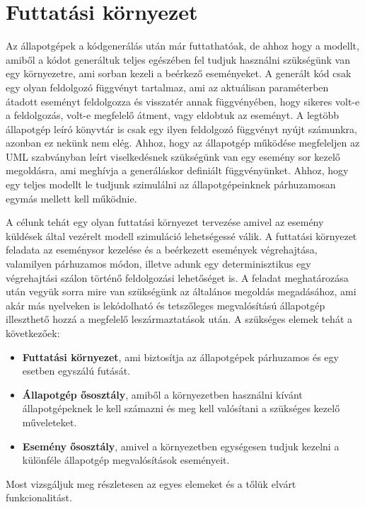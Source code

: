 \documentclass[a4paper,12pt]{report}
\begin{document}
\section{Futtatási környezet}

Az állapotgépek a kódgenerálás után már futtathatóak, de ahhoz hogy a modellt, amiből a kódot generáltuk teljes egészében fel tudjuk használni szükségünk van egy környezetre, ami sorban kezeli a beérkező eseményeket. A generált kód csak egy olyan feldolgozó függvényt tartalmaz, ami az aktuálisan paraméterben átadott eseményt feldolgozza és visszatér annak függvényében, hogy sikeres volt-e a feldolgozás, volt-e megfelelő átment, vagy eldobtuk az eseményt. A legtöbb állapotgép leíró könyvtár is csak egy ilyen feldolgozó függvényt nyújt számunkra, azonban ez nekünk nem elég. Ahhoz, hogy az állapotgép működése megfeleljen az UML szabványban leírt viselkedésnek szükségünk van egy esemény sor kezelő megoldásra, ami meghívja a generáláskor definiált függvényünket. Ahhoz, hogy egy teljes modellt le tudjunk szimulálni az állapotgépeinknek párhuzamosan egymás mellett kell működnie. 

A célunk tehát egy olyan futtatási környezet tervezése amivel az esemény küldések által vezérelt modell szimuláció lehetségessé válik. A futtatási környezet feladata az eseménysor kezelése és a beérkezett események végrehajtása, valamilyen párhuzamos módon, illetve adunk egy determinisztikus egy végrehajtási szálon történő feldolgozási lehetőséget is. A feladat meghatározása után vegyük sorra mire van szükségünk az általános megoldás megadásához, ami akár más nyelveken is lekódolható és tetszőleges megvalósítású állapotgép illeszthető hozzá a megfelelő leszármaztatások után. A szükséges elemek tehát a következőek:
\begin{itemize}
\item {\bf Futtatási környezet}, ami biztosítja az állapotgépek párhuzamos és egy esetben egyszálú futását.
\item {\bf Állapotgép ősosztály}, amiből a környezetben használni kívánt állapotgépeknek le kell számazni és meg kell valósítani a szükséges kezelő műveleteket.
\item {\bf Esemény ősosztály}, amivel a környezetben egységesen tudjuk kezelni a különféle állapotgép megvalósítások eseményeit. 
\end{itemize} 
Most vizsgáljuk meg részletesen az egyes elemeket és a tőlük elvárt funkcionalitást.
\end{document}
